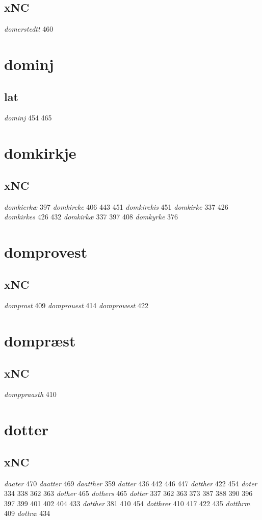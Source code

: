 \documentclass[a4paper,twocolumn]{article}
\begin{document}
\subsection{xNC}
\label{sec:org3a62b4b}
\emph{domerstedtt} 460 
\section{dominj}
\label{sec:org5e1f526}
\subsection{lat}
\label{sec:org19c9cc2}
\emph{dominj} 454 465 
\section{domkirkje}
\label{sec:org93cb3c9}
\subsection{xNC}
\label{sec:orgc15df11}
\emph{domkierkæ} 397 \emph{domkircke} 406 443 451 \emph{domkirckis} 451 \emph{domkirke} 337 426 \emph{domkirkes} 426 432 \emph{domkirkæ} 337 397 408 \emph{domkyrke} 376 
\section{domprovest}
\label{sec:orgc6aedfd}
\subsection{xNC}
\label{sec:org04a1f85}
\emph{domprost} 409 \emph{domprouest} 414 \emph{domprowest} 422 
\section{dompræst}
\label{sec:org0319539}
\subsection{xNC}
\label{sec:org08b0e02}
\emph{domppraasth} 410 
\section{dotter}
\label{sec:org5b9c2be}
\subsection{xNC}
\label{sec:org4a72c0c}
\emph{daater} 470 \emph{daatter} 469 \emph{daatther} 359 \emph{datter} 436 442 446 447 \emph{datther} 422 454 \emph{doter} 334 338 362 363 \emph{dother} 465 \emph{dothers} 465 \emph{dotter} 337 362 363 373 387 388 390 396 397 399 401 402 404 433 \emph{dotther} 381 410 454 \emph{dotthrer} 410 417 422 435 \emph{dotthrm} 409 \emph{dottræ} 434 
\end{document}
